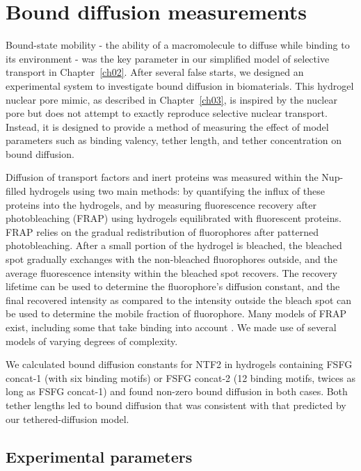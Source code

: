 \chapter{Bound diffusion measurements}\label{ch04}
\label{ch:bound-diffusion}

Bound-state mobility - the ability of a macromolecule to diffuse while binding to its environment - was the key parameter in our simplified model of selective transport in Chapter~\ref{ch02}.  After several false starts, we designed an experimental system to investigate bound diffusion in biomaterials.  This hydrogel nuclear pore mimic, as described in Chapter~\ref{ch03}, is inspired by the nuclear pore but does not attempt to exactly reproduce selective nuclear transport.  Instead, it is designed to provide a method of measuring the effect of model parameters such as binding valency, tether length, and tether concentration on bound diffusion.

Diffusion of transport factors and inert proteins was measured within the Nup-filled hydrogels using two main methods: by quantifying the influx of these proteins into the hydrogels, and by measuring fluorescence recovery after photobleaching (FRAP) using hydrogels equilibrated with fluorescent proteins.  FRAP relies on the gradual redistribution of fluorophores after patterned photobleaching.   After a small portion of the hydrogel is bleached, the bleached spot gradually exchanges with the non-bleached fluorophores outside, and the average fluorescence intensity within the bleached spot recovers.  The recovery lifetime can be used to determine the fluorophore's diffusion constant, and the final recovered intensity as compared to the intensity outside the bleach spot can be used to determine the mobile fraction of fluorophore.  Many models of FRAP exist, including some that take binding into account \cite{sprague04, wu12, kang10, kang12}. We made use of several models of varying degrees of complexity.

We calculated bound diffusion constants for NTF2 in hydrogels containing FSFG concat-1 (with six binding motifs) or FSFG concat-2 (12 binding motifs, twices as long as FSFG concat-1) and found non-zero bound diffusion in both cases.  Both tether lengths led to bound diffusion that was consistent with that predicted by our tethered-diffusion model.

\section{Experimental parameters}

